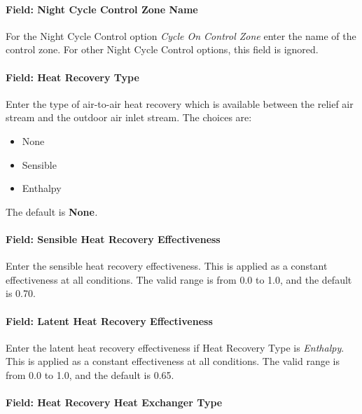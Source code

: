 \paragraph{Field: Night Cycle Control Zone Name}\label{field-night-cycle-control-zone-name-4}

For the Night Cycle Control option \emph{Cycle On Control Zone} enter the name of the control zone. For other Night Cycle Control options, this field is ignored.

\paragraph{Field: Heat Recovery Type}\label{field-heat-recovery-type-6}

Enter the type of air-to-air heat recovery which is available between the relief air stream and the outdoor air inlet stream. The choices are:

\begin{itemize}
\item
  None
\item
  Sensible
\item
  Enthalpy
\end{itemize}

The default is \textbf{None}\emph{.}

\paragraph{Field: Sensible Heat Recovery Effectiveness}\label{field-sensible-heat-recovery-effectiveness-6}

Enter the sensible heat recovery effectiveness. This is applied as a constant effectiveness at all conditions. The valid range is from 0.0 to 1.0, and the default is 0.70.

\paragraph{Field: Latent Heat Recovery Effectiveness}\label{field-latent-heat-recovery-effectiveness-6}

Enter the latent heat recovery effectiveness if Heat Recovery Type is \emph{Enthalpy}. This is applied as a constant effectiveness at all conditions. The valid range is from 0.0 to 1.0, and the default is 0.65.

\paragraph{Field: Heat Recovery Heat Exchanger Type}\label{field-heat-recovery-heat-exchanger-type-1}


